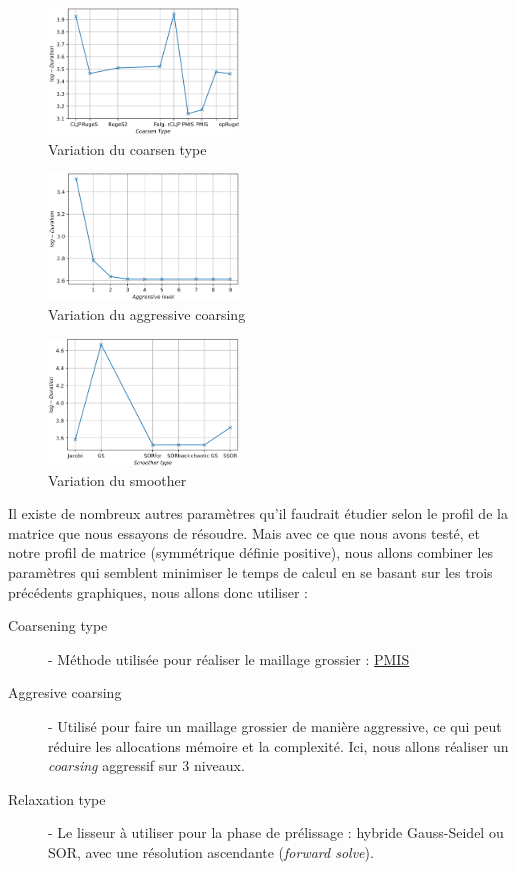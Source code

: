 \documentclass[10pt,twocolumn,letterpaper]{article}
\begin{document}
\begin{figure}[H]
  \caption{Variation du coarsen type}
  \includegraphics[width=0.45\textwidth]{fig/strong_coarsen_type.png}
\end{figure}

\begin{figure}[H]
    \centering
    \caption{Variation du aggressive coarsing}
    \includegraphics[width=0.45\textwidth]{fig/strong_agg_level.png}
  \end{figure}

  \begin{figure}[H]
    \centering
    \caption{Variation du smoother}
    \includegraphics[width=0.45\textwidth]{fig/strong_smoother.png}
  \end{figure}

Il existe de nombreux autres paramètres qu'il faudrait étudier selon le profil
de la matrice que nous essayons de résoudre. Mais avec ce que nous avons testé,
et notre profil de matrice (symmétrique définie positive), nous allons combiner
les paramètres qui semblent minimiser le temps de calcul en se basant sur les
trois précédents graphiques, nous allons donc utiliser :

\begin{description}
  \item[Coarsening type] - Méthode utilisée pour réaliser le maillage grossier :
\href{https://hypre.readthedocs.io/en/latest/ch-references.html#dfny2008}{PMIS}
  \item[Aggresive coarsing] - Utilisé pour faire un maillage grossier de manière
aggressive, ce qui peut réduire les allocations mémoire et la complexité. Ici, 
nous allons réaliser un \textit{coarsing} aggressif sur 3 niveaux. 
  \item[Relaxation type] - Le lisseur à utiliser pour la phase de prélissage :
hybride Gauss-Seidel ou SOR, avec une résolution ascendante (\textit{forward
solve}).
\end{description}
\end{document}
